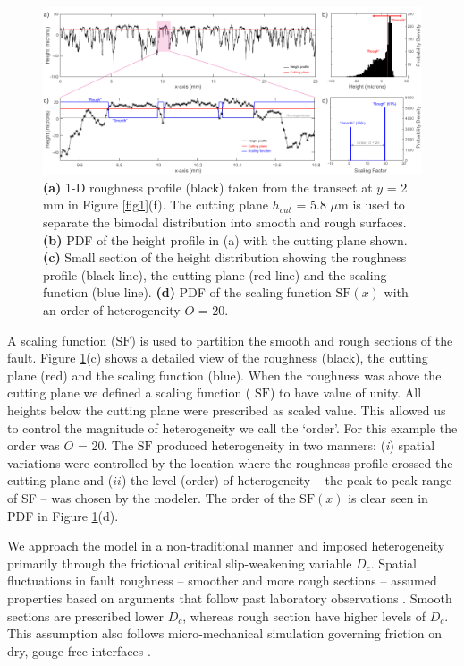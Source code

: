 \documentclass[preprint,1p, 10pt,authoryear]{elsarticle}
\begin{document}
\begin{figure}[ht]
	\centering
	\includegraphics{FIG3.pdf} 
	\caption{ \textbf{(a)} 1-D roughness profile (black) taken from the transect at $y$ = 2 mm in Figure \ref{fig1}(f).  The cutting plane $h_{cut}$ = 5.8 $\mu$m is used to separate the bimodal distribution into smooth and rough surfaces. \textbf{(b)} PDF of the height profile in (a) with the cutting plane shown. \textbf{(c)} Small section of the height distribution showing the roughness profile (black line), the cutting plane (red line) and the scaling function (blue line). \textbf{(d)} PDF of the scaling function $\mathrm{SF}(x)$ with an order of heterogeneity $O$ = 20.}
	\label{fig3}
\end{figure}

A scaling function ($\mathrm{SF}$) is used to partition the smooth and rough sections of the fault. Figure \ref{fig3}(c) shows a detailed view of the roughness (black), the cutting plane (red) and the scaling function (blue). When the roughness was above the cutting plane we defined a scaling function ( $\mathrm{SF}$) to have value of unity. All heights below the cutting plane were prescribed as scaled value. This allowed us to control the magnitude of heterogeneity we call the `order'. For this example the order was $O$ = 20. The  $\mathrm{SF}$ produced heterogeneity in two manners: (\textit{i}) spatial variations were controlled by the location where the roughness profile crossed the cutting plane and ($ii$) the level (order) of heterogeneity -- the peak-to-peak range of SF -- was chosen by the modeler. The order of the $\mathrm{SF}(x)$ is clear seen in PDF in Figure \ref{fig3}(d).

We approach the model in a non-traditional manner and imposed heterogeneity primarily through the frictional critical slip-weakening variable $D_{c}$. Spatial fluctuations in fault roughness -- smoother and more rough sections -- assumed properties based on arguments that follow past laboratory observations \citep{Marone1994}. Smooth sections are prescribed lower $D_{c}$, whereas rough section have higher levels of $D_{c}$. This assumption also follows micro-mechanical simulation governing friction on dry, gouge-free interfaces \citep{Yoshioka1996,Yoshioka1997}. 
\end{document}
